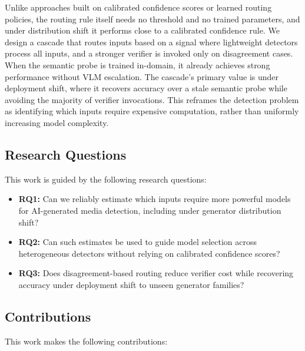 \documentclass{ieeeaccess}
\begin{document}
Unlike approaches built on calibrated confidence scores or learned routing policies, the routing rule itself needs no threshold and no trained parameters, and under distribution shift it performs close to a calibrated confidence rule. We design a cascade that routes inputs based on a signal where lightweight detectors process all inputs, and a stronger verifier is invoked only on disagreement cases. When the semantic probe is trained in-domain, it already achieves strong performance without VLM escalation. The cascade's primary value is under deployment shift, where it recovers
accuracy over a stale semantic probe while avoiding the majority of verifier invocations. This reframes the detection problem as identifying which inputs require expensive computation, rather than uniformly increasing model complexity.

\subsection{Research Questions}

This work is guided by the following research questions:

\begin{itemize}
    \item \textbf{RQ1:} Can we reliably estimate which inputs require more powerful models
    for AI-generated media detection, including under generator distribution shift?
    \item \textbf{RQ2:} Can such estimates be used to guide model selection across heterogeneous detectors without relying on calibrated confidence scores?
    \item \textbf{RQ3:} Does disagreement-based routing reduce verifier cost while recovering accuracy under deployment shift to unseen generator families?
\end{itemize}

\subsection{Contributions}

This work makes the following contributions:
\end{document}
